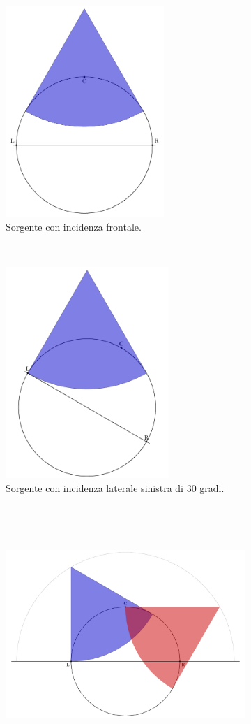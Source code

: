 \begin{figure}[t!]
    \centering
    \begin{subfigure}[t]{0.45\textwidth}
        \centering
        \includegraphics[height=8cm]{CAPITOLI/_TIKZ/PANNING/pan-frontal}
        \caption[]{Sorgente con incidenza frontale.}
        \label{pan:frontal}
    \end{subfigure}%
    ~
    \begin{subfigure}[t]{0.45\textwidth}
        \centering
        \includegraphics[height=8cm]{CAPITOLI/_TIKZ/PANNING/pan-left}
        \caption[]{Sorgente con incidenza laterale sinistra di 30 gradi.}
        \label{pan:left}
    \end{subfigure}
    \\
    \begin{subfigure}[t]{0.9\textwidth}
        \centering
        \includegraphics[height=8cm]{CAPITOLI/_TIKZ/PANNING/pan-both}

\end{subfigure}
\end{figure}
